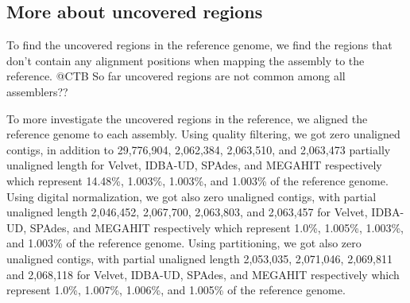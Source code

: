 
\subsection*{More about uncovered regions}
To find the uncovered regions in the reference genome, we find the regions that don't contain any alignment positions when mapping the assembly to the reference.  @CTB So far uncovered regions are not common among all assemblers?? 

To more investigate the uncovered regions in the reference, we aligned the reference genome to each assembly. Using quality filtering, we got zero unaligned contigs, in addition to 29,776,904, 2,062,384, 2,063,510, and 2,063,473 partially unaligned length for Velvet, IDBA-UD, SPAdes, and MEGAHIT respectively which represent 14.48\%, 1.003\%, 1.003\%, and 1.003\% of the reference genome. 
Using digital normalization, we got also zero unaligned contigs, with partial unaligned length 2,046,452, 2,067,700, 2,063,803, and 2,063,457 for Velvet, IDBA-UD, SPAdes, and MEGAHIT respectively which represent 1.0\%, 1.005\%, 1.003\%, and 1.003\% of the reference genome. 
Using partitioning, we got also zero unaligned contigs, with partial unaligned length 2,053,035, 2,071,046, 2,069,811 and 2,068,118 for Velvet, IDBA-UD, SPAdes, and MEGAHIT respectively which represent 1.0\%, 1.007\%, 1.006\%, and 1.005\% of the reference genome. 

